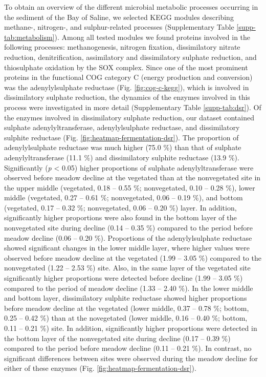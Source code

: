 \documentclass[
  12 pt,
]{article}
\begin{document}
To obtain an overview of the different microbial metabolic processes occurring in the sediment of the Bay of Saline, we selected KEGG modules describing methane-, nitrogen-, and sulphur-related processes (Supplementary Table \ref{supp-tab:metabolism}). Among all tested modules we found proteins involved in the following processes: methanogenesis, nitrogen fixation, dissimilatory nitrate reduction, denitrification, assimilatory and dissimilatory sulphate reduction, and thiosulphate oxidation by the SOX complex. Since one of the most prominent proteins in the functional COG category C (energy production and conversion) was the adenylylsulphate reductase (Fig. \ref{fig:cog-c-kegg}), which is involved in dissimilatory sulphate reduction, the dynamics of the enzymes involved in this process were investigated in more detail (Supplementary Table \ref{supp-tab:dsr}). Of the enzymes involved in dissimilatory sulphate reduction, our dataset contained sulphate adenylyltransferase, adenylylsulphate reductase, and dissimilatory sulphite reductase (Fig. \ref{fig:heatmap-fermentation-dsr}). The proportion of adenylylsulphate reductase was much higher (75.0 \si{\percent}) than that of sulphate adenylyltransferase (11.1 \si{\percent}) and dissimilatory sulphite reductase (13.9 \si{\percent}). Significantly (\emph{p} \textless{} 0.05) higher proportions of sulphate adenylyltransferase were observed before meadow decline at the vegetated than at the nonvegetated site in the upper middle (vegetated, 0.18 -- 0.55 \si{\percent}; nonvegetated, 0.10 -- 0.28 \si{\percent}), lower middle (vegetated, 0.27 -- 0.61 \si{\percent}; nonvegetated, 0.06 -- 0.19 \si{\percent}), and bottom (vegetated, 0.17 -- 0.32 \si{\percent}; nonvegetated, 0.06 -- 0.20 \si{\percent}) layer. In addition, significantly higher proportions were also found in the bottom layer of the nonvegetated site during decline (0.14 -- 0.35 \si{\percent}) compared to the period before meadow decline (0.06 -- 0.20 \si{\percent}). Proportions of the adenylylsulphate reductase showed significant changes in the lower middle layer, where higher values were observed before meadow decline at the vegetated (1.99 -- 3.05 \si{\percent}) compared to the nonvegetated (1.22 -- 2.53 \si{\percent}) site. Also, in the same layer of the vegetated site significantly higher proportions were detected before decline (1.99 -- 3.05 \si{\percent}) compared to the period of meadow decline (1.33 -- 2.40 \si{\percent}). In the lower middle and bottom layer, dissimilatory sulphite reductase showed higher proportions before meadow decline at the vegetated (lower middle, 0.37 -- 0.78 \si{\percent}; bottom, 0.25 -- 0.42 \si{\percent}) than at the novegetated (lower middle, 0.16 -- 0.40 \si{\percent}; bottom, 0.11 -- 0.21 \si{\percent}) site. In addition, significantly higher proportions were detected in the bottom layer of the nonvegetated site during decline (0.17 -- 0.39 \si{\percent}) compared to the period before meadow decline (0.11 -- 0.21 \si{\percent}). In contrast, no significant differences between sites were observed during the meadow decline for either of these enzymes (Fig. \ref{fig:heatmap-fermentation-dsr}).
\end{document}
